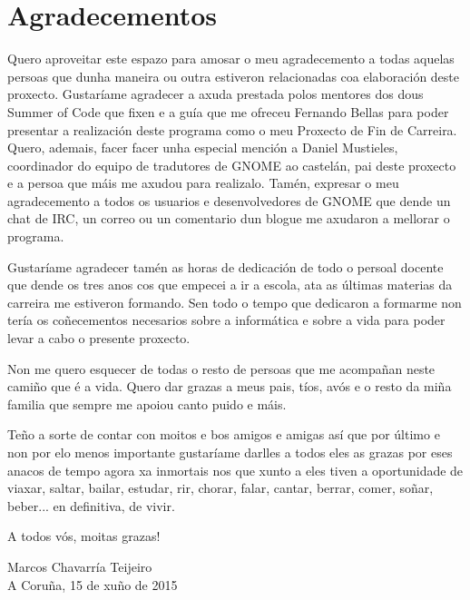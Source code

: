 %
%

\section*{Agradecementos}

Quero aproveitar este espazo para amosar o meu agradecemento a todas aquelas persoas que dunha maneira ou outra estiveron relacionadas coa elaboración deste proxecto. Gustaríame agradecer a axuda prestada polos mentores dos dous Summer of Code que fixen e a guía que me ofreceu Fernando Bellas para poder presentar a realización deste programa como o meu Proxecto de Fin de Carreira. Quero, ademais, facer facer unha especial mención a Daniel Mustieles, coordinador do equipo de tradutores de GNOME ao castelán, pai deste proxecto e a persoa que máis me axudou para realizalo. Tamén, expresar o meu agradecemento a todos os usuarios e desenvolvedores de GNOME que dende un chat de IRC, un correo ou un comentario dun blogue me axudaron a mellorar o programa.

Gustaríame agradecer tamén as horas de dedicación de todo o persoal docente que dende os tres anos cos que empecei a ir a escola, ata as últimas materias da carreira me estiveron formando. Sen todo o tempo que dedicaron a formarme non tería os coñecementos necesarios sobre a informática e sobre a vida para poder levar a cabo o presente proxecto.

Non me quero esquecer de todas o resto de persoas que me acompañan neste camiño que é a vida. Quero dar grazas a meus pais, tíos, avós  e o resto da miña familia que sempre me apoiou canto puido e máis.

Teño a sorte de contar con moitos e bos amigos e amigas así que por último e non por elo menos importante gustaríame darlles a todos eles as grazas por eses anacos de tempo agora xa inmortais nos que xunto a eles tiven a oportunidade de viaxar, saltar, bailar, estudar, rir, chorar, falar, cantar, berrar, comer, soñar, beber... en definitiva, de vivir. 

A todos vós, moitas grazas!


\begin{flushright}
  Marcos Chavarría Teijeiro \\
  A Coruña, 15 de xuño de 2015
\end{flushright}


